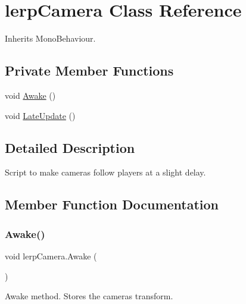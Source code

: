 \hypertarget{classlerp_camera}{}\section{lerp\+Camera Class Reference}
\label{classlerp_camera}


Inherits Mono\+Behaviour.

\subsection*{Private Member Functions}
\begin{DoxyCompactItemize}
\item 
void \hyperlink{classlerp_camera_a986394a1867671a6e4eaab1ef781b4f4}{Awake} ()
\item 
void \hyperlink{classlerp_camera_aa74e3fe415c06c88a1179e46fd136955}{Late\+Update} ()
\end{DoxyCompactItemize}


\subsection{Detailed Description}
Script to make cameras follow players at a slight delay. 



\subsection{Member Function Documentation}
\mbox{\label{classlerp_camera_a986394a1867671a6e4eaab1ef781b4f4}} 
\subsubsection{\texorpdfstring{Awake()}{Awake()}}
{\footnotesize\ttfamily void lerp\+Camera.\+Awake (\begin{DoxyParamCaption}{ }\end{DoxyParamCaption})\hspace{0.3cm}{\ttfamily [private]}}



Awake method. Stores the camera\textquotesingle{}s transform. 

\mbox{\label{classlerp_camera_aa74e3fe415c06c88a1179e46fd136955}} 
